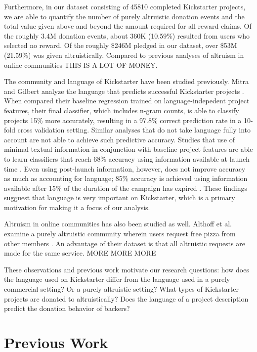 \documentclass[letterpaper]{article}
\begin{document}
Furthermore, in our dataset consisting of 45810 completed Kickstarter projects, we are able to quantify the number of purely altruistic donation events and the total value given above and beyond the amount required for all reward claims. Of the roughly 3.4M donation events, about 360K (10.59\%) resulted from users who selected no reward. Of the roughly \$246M pledged in our dataset, over \$53M (21.59\%) was given altruistically. Compared to previous analyses of altruism in online communities THIS IS A LOT OF MONEY.

The community and language of Kickstarter have been studied previously. Mitra and Gilbert analyze the language that predicts successful Kickstarter projects \cite{mitra2014language}. When compared their baseline regression trained on language-indepedent project features, their final classifier, which includes n-gram counts, is able to classify projects 15\% more accurately, resulting in a 97.8\% correct prediction rate in a 10-fold cross validation setting. Similar analyses that do not take language fully into account are not able to achieve such predictive accuracy. Studies that use of minimal textual information in conjunction with baseline project features are able to learn classifiers that reach 68\% accuracy using information available at launch time \cite{greenberg2013crowdfunding}. Even using post-launch information, however, does not improve accuracy as much as accounting for language; 85\% accuracy is achieved using information available after 15\% of the duration of the campaign has expired \cite{etter2013launch}. These findings sugguest that language is very important on Kickstarter, which is a primary motivation for making it a focus of our analysis.

Altruism in online communities has also been studied as well. Althoff et al. examine a purely altruistic community wherein users request free pizza from other members \cite{althoff2014ask}. An advantage of their dataset is that all altruistic requests are made for the same service. MORE MORE MORE

These observations and previous work motivate our research questions: how does the language used on Kickstarter differ from the language used in a purely commercial setting? Or a purely altruistic setting? What types of Kickstarter projects are donated to altruistically? Does the language of a project description predict the donation behavior of backers?

\section{Previous Work}
\end{document}

